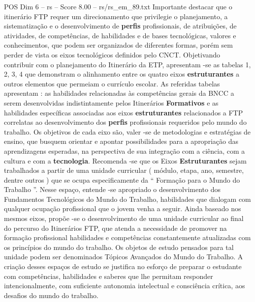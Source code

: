 \begin{textsample}{POS Dim 6 – rs – Score 8.00 – rs/rs\_em\_89.txt}
Importante destacar que o itinerário FTP requer um direcionamento que privilegie o planejamento, a sistematização e o desenvolvimento de \textbf{perfis} profissionais, de atribuições, de atividades, de competências, de habilidades e de bases tecnológicas, valores e conhecimentos, que podem ser organizados de diferentes formas, porém sem perder de vista os eixos tecnológicos definidos pelo CNCT.
Objetivando contribuir com o planejamento do Itinerário da ETP, apresentam -se as tabelas 1, 2, 3, 4 que demonstram o alinhamento entre os quatro eixos \textbf{estruturantes} a outros elementos que permeiam o currículo escolar.
As referidas tabelas apresentam : as habilidades relacionadas às competências gerais da BNCC a serem desenvolvidas indistintamente pelos Itinerários \textbf{Formativos} e as habilidades específicas associadas aos eixos \textbf{estruturantes} relacionados a FTP correlatas ao desenvolvimento dos \textbf{perfis} profissionais requeridos pelo mundo do trabalho.
Os objetivos de cada eixo são, valer -se de metodologias e estratégias de ensino, que busquem orientar e apontar possibilidades para a apropriação das aprendizagens esperadas, na perspectiva de sua integração com a ciência, com a cultura e com a \textbf{tecnologia}.
Recomenda -se que os Eixos \textbf{Estruturantes} sejam trabalhados a partir de uma unidade curricular ( módulo, etapa, ano, semestre, dentre outros ) que se ocupa especificamente da “ Formação para o Mundo do Trabalho ”.
Nesse espaço, entende -se apropriado o desenvolvimento dos Fundamentos Tecnológicos do Mundo do Trabalho, habilidades que dialogam com qualquer ocupação profissional que o jovem venha a seguir.
Ainda baseado nos mesmos eixos, propõe -se o desenvolvimento de uma unidade curricular ao final do percurso do Itinerários FTP, que atenda a necessidade de promover na formação profissional habilidades e competências constantemente atualizadas com os princípios do mundo do trabalho.
Os objetos de estudo pensados para tal unidade podem ser denominados Tópicos Avançados do Mundo do Trabalho.
A criação desses espaços de estudo se justifica no esforço de preparar o estudante com competências, habilidades e saberes que lhe permitam responder intencionalmente, com suficiente autonomia intelectual e consciência crítica, aos desafios do mundo do trabalho.

\end{textsample}
